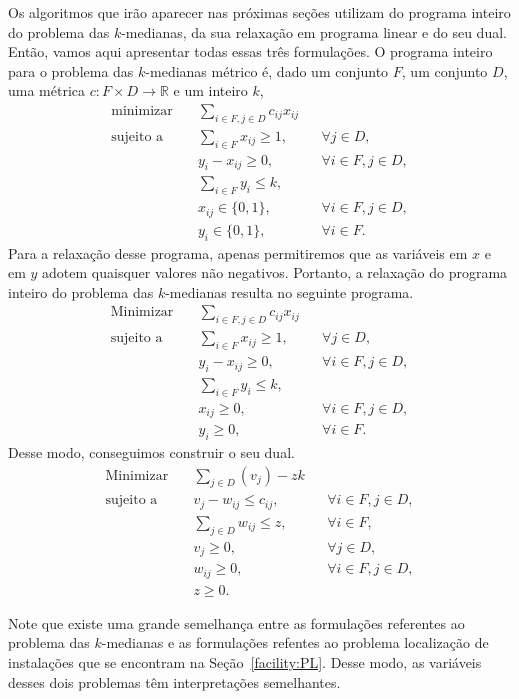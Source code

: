 Os algoritmos que irão aparecer nas próximas seções utilizam do programa inteiro do problema das $k$-medianas, da sua relaxação em programa linear e do seu dual. Então, vamos aqui apresentar todas essas três formulações. O programa inteiro para o problema das $k$-medianas métrico é, dado um conjunto $F$, um conjunto $D$, uma métrica $c : F\times D \rightarrow \mathbb{R}$ e um inteiro $k$,
\begin{align*}
\text{minimizar} \quad & \sum_{i \in F, j \in D} c_{ij}x_{ij} \\
\text{sujeito a} \quad & \sum_{i \in F} x_{ij} \geq 1, &&\forall j \in D, \\
                       & y_i - x_{ij} \geq 0, &&\forall i \in F, j \in D, \\
                       & \sum_{i \in F} y_i \leq k, \\
                       & x_{ij} \in \{0,1\}, && \forall i \in F,j \in D, \\
                       & y_i \in \{0,1\}, &&\forall i \in F. 
\end{align*}
Para a relaxação desse programa, apenas permitiremos que as variáveis em $x$ e em $y$ adotem quaisquer valores não negativos. Portanto, a relaxação do programa inteiro do problema das $k$-medianas resulta no seguinte programa.
\begin{align}
    \text{Minimizar} \quad & \sum_{i \in F, j \in D} c_{ij}x_{ij} \nonumber \\
    \text{sujeito a} \quad & \sum_{i \in F} x_{ij} \geq 1, &&\forall j \in D, \nonumber\\
                           & y_i - x_{ij} \geq 0, &&\forall i \in F, j \in D, \nonumber \\
                           & \sum_{i \in F} y_i \leq k, \\
                           & x_{ij} \geq 0, && \forall i \in F,j \in D, \nonumber \\
                           & y_i \geq 0, &&\forall i \in F. \nonumber 
\end{align}
Desse modo, conseguimos construir o seu dual.
\begin{align*}
    \text{Minimizar} \quad & \sum_{j \in D} (v_j) - zk \\
    \text{sujeito a} \quad & v_j - w_{ij} \leq c_{ij}, &&\forall i \in F, j\in D, \\
                           & \sum_{j\in D} w_{ij} \leq z, &&\forall i \in F, \\
                           & v_j \geq 0, &&\forall j\in D, \\
                           & w_{ij} \geq 0, && \forall i \in F,j \in D, \\
                           & z \geq 0. 
\end{align*}

Note que existe uma grande semelhança entre as formulações referentes ao problema das $k$-medianas e as formulações refentes ao problema localização de instalações que se encontram na Seção~\ref{facility:PL}. Desse modo, as variáveis desses dois problemas têm interpretações semelhantes.